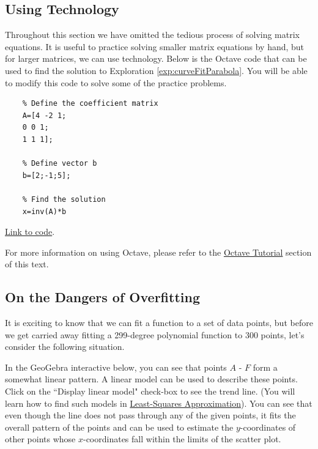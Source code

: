 \documentclass{ximera}
\begin{document}
\subsection*{Using Technology}
Throughout this section we have omitted the tedious process of solving matrix equations.  It is useful to practice solving smaller  matrix equations by hand, but for larger matrices, we can use technology.  Below is the Octave code that can be used to find the solution to Exploration \ref{exp:curveFitParabola}.  You will be able to modify this code to solve some of the practice problems.  

\begin{verbatim}
    % Define the coefficient matrix
    A=[4 -2 1;
    0 0 1;
    1 1 1];
    
    % Define vector b
    b=[2;-1;5];
    
    % Find the solution
    x=inv(A)*b
\end{verbatim}

\href{https://sagecell.sagemath.org/?z=eJxTVXBJTcvMS1UoyUhVSM5PTUvLTM5MzStRyE0sKcqs4OVytI02UdA1UjC05uUyUDAA04YKQBgLZPByqcL0l6Uml-QXKSTxciXZRhtZ6xpam8JUuGXmpYDNL87PKS3JzM_j5aqwzcwr03DU1EoCAP6FIxo=&lang=octave&interacts=eJyLjgUAARUAuQ==}{Link to code}.

For more information on using Octave, please refer to the \href{https://ximera.osu.edu/linearalgebradzv3/xOctave}{Octave Tutorial} section of this text.

\subsection*{On the Dangers of Overfitting}
It is exciting to know that we can fit a function to a set of data points, but before we get carried away fitting a 299-degree polynomial function to 300 points, let's consider the following situation.

In the GeoGebra interactive below, you can see that points $A$ - $F$ form a somewhat linear pattern.  A linear model can be used to describe these points.  Click on the ``Display linear model" check-box to see the trend line.  (You will learn how to find such models in \href{https://ximera.osu.edu/linearalgebradzv3/LinearAlgebra/RTH-0030/main}{Least-Squares Approximation}).  You can see that even though the line does not pass through any of the given points, it fits the overall pattern of the points and can be used to estimate the $y$-coordinates of other points whose $x$-coordinates fall within the limits of the scatter plot.
\end{document}
